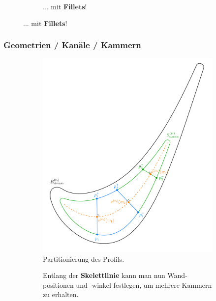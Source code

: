 \documentclass[8pt, aspectratio=169]{beamer}
\begin{document}
\begin{frame}
\begin{minipage}[t]{\textwidth}
\begin{figure}[H]
\begin{subfigure}{.32\textwidth}
				\caption{... mit \textbf{Fillets}!}
			\end{subfigure}
		\end{figure}
	\end{minipage}
	\vfill
\end{frame}

\begin{frame}
	\frametitle{Geometrien / Kanäle / Kammern}
	\vspace{-0.7cm}\hspace{-0.5cm}
	\centering
	\begin{minipage}[t]{\textwidth}
		\begin{figure}[H]
			\centering
			\begin{subfigure}[t]{.5\textwidth}
				\includegraphics[width=.8\textwidth]{../../tec/chambers/61.png}
				\caption{Partitionierung des Profils.}
			\end{subfigure}
			\begin{subfigure}{.39\textwidth}
				Entlang der \textbf{Skelettlinie} kann man nun Wand-positionen und -winkel festlegen, um mehrere Kammern zu erhalten.\\


\end{subfigure}
\end{figure}
\end{minipage}
\end{frame}
\end{document}
